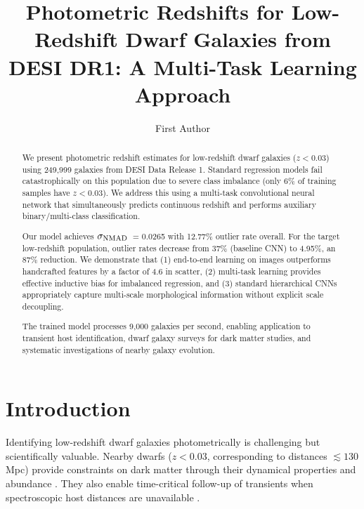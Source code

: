 \documentclass[linenumbers,twocolumn]{aastex7}
\newcommand{\sigmaNMAD}{\ensuremath{\sigma_{\rm NMAD}}}
\newcommand{\lowz}{\ensuremath{z < 0.03}}
\begin{document}
\title{Photometric Redshifts for Low-Redshift Dwarf Galaxies from DESI DR1: 
A Multi-Task Learning Approach}


\author{First Author}


\begin{abstract}
We present photometric redshift estimates for low-redshift dwarf galaxies 
(\lowz) using 249,999 galaxies from DESI Data Release 1. Standard regression 
models fail catastrophically on this population due to severe class imbalance 
(only 6\% of training samples have \lowz). We address this using a multi-task 
convolutional neural network that simultaneously predicts continuous redshift 
and performs auxiliary binary/multi-class classification.

Our model achieves \sigmaNMAD\ = 0.0265 with 12.77\% outlier rate overall. 
For the target low-redshift population, outlier rates decrease from 37\% 
(baseline CNN) to 4.95\%, an 87\% reduction. We demonstrate that (1) 
end-to-end learning on images outperforms handcrafted features by a factor 
of 4.6 in scatter, (2) multi-task learning provides effective inductive bias 
for imbalanced regression, and (3) standard hierarchical CNNs appropriately 
capture multi-scale morphological information without explicit scale decoupling.

The trained model processes 9,000 galaxies per second, enabling application to 
transient host identification, dwarf galaxy surveys for dark matter studies, 
and systematic investigations of nearby galaxy evolution.
\end{abstract}


\section{Introduction}

Identifying low-redshift dwarf galaxies photometrically is challenging but 
scientifically valuable. Nearby dwarfs ($z < 0.03$, corresponding to distances 
$\lesssim 130$ Mpc) provide constraints on dark matter through their dynamical 
properties and abundance \citep{Bullock2017}. They also enable time-critical 
follow-up of transients when spectroscopic host distances are unavailable 
\citep{Foley2013}.
\end{document}
